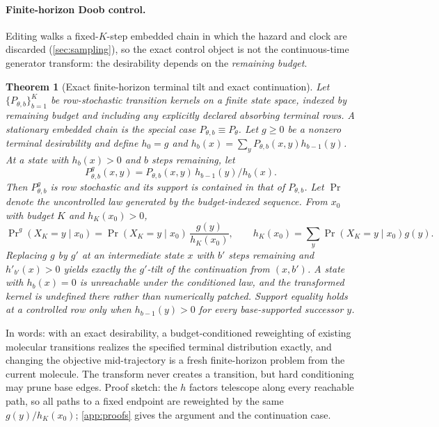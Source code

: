 \documentclass{article}
\newcommand{\Pmol}{P_{\theta}}
\newtheorem{theorem}{Theorem}
\theoremstyle{definition}
\theoremstyle{remark}
\begin{document}
\paragraph{Finite-horizon Doob control.}
Editing walks a fixed-$K$-step embedded chain in which the hazard and clock are discarded (\cref{sec:sampling}), so the exact control object is not the continuous-time generator transform: the desirability depends on the \emph{remaining budget}.

\begin{theorem}[Exact finite-horizon terminal tilt and exact continuation]\label{thm:finite-doob}
Let $\{P_{\theta,b}\}_{b=1}^{K}$ be row-stochastic transition kernels on a finite state space, indexed by remaining budget and including any explicitly declared absorbing terminal rows. A stationary embedded chain is the special case $P_{\theta,b}\equiv\Pmol$. Let $g\ge0$ be a nonzero terminal desirability and define $h_0=g$ and $h_b(x)=\sum_yP_{\theta,b}(x,y)h_{b-1}(y)$. At a state with $h_b(x)>0$ and $b$ steps remaining, let
\begin{equation}
P^{g}_{\theta,b}(x,y)=P_{\theta,b}(x,y)\,h_{b-1}(y)/h_b(x).
\label{eq:finite-doob}
\end{equation}
Then $P^{g}_{\theta,b}$ is row stochastic and its support is contained in that of $P_{\theta,b}$. Let $\Pr$ denote the uncontrolled law generated by the budget-indexed sequence. From $x_0$ with budget $K$ and $h_K(x_0)>0$,
\begin{equation}
\Pr\nolimits^{g}(X_K=y\mid x_0)=\Pr(X_K=y\mid x_0)\,\frac{g(y)}{h_K(x_0)},
\qquad h_K(x_0)=\textstyle\sum_y\Pr(X_K=y\mid x_0)g(y).
\label{eq:finite-tilt}
\end{equation}
Replacing $g$ by $g'$ at an intermediate state $x$ with $b'$ steps remaining and $h'_{b'}(x)>0$ yields exactly the $g'$-tilt of the continuation from $(x,b')$. A state with $h_b(x)=0$ is unreachable under the conditioned law, and the transformed kernel is undefined there rather than numerically patched. Support equality holds at a controlled row only when $h_{b-1}(y)>0$ for every base-supported successor $y$.
\end{theorem}

In words: with an exact desirability, a budget-conditioned reweighting of existing molecular transitions realizes the specified terminal distribution exactly, and changing the objective mid-trajectory is a fresh finite-horizon problem from the current molecule. The transform never creates a transition, but hard conditioning may prune base edges. Proof sketch: the $h$ factors telescope along every reachable path, so all paths to a fixed endpoint are reweighted by the same $g(y)/h_K(x_0)$; \cref{app:proofs} gives the argument and the continuation case.
\end{document}
